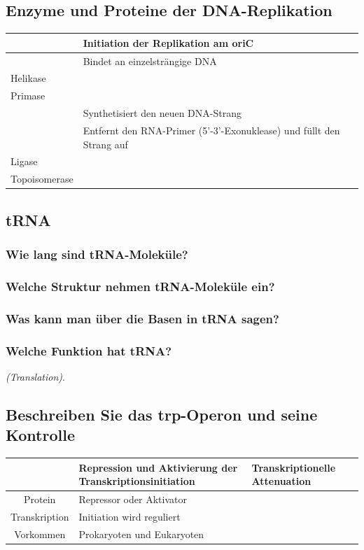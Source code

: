 \documentclass{article}
\begin{document}
\subsection*{Enzyme und Proteine der DNA-Replikation}
\begin{table}[H]
    \centering 
    \begin{tabular}{|p{4cm}|p{11cm}|}
    \hline
     &  Initiation der Replikation am oriC\\\hline 
     & Bindet an einzelsträngige DNA  \\\hline
    Helikase &  \\\hline
    Primase &   \\\hline
     & Synthetisiert den neuen DNA-Strang \\\hline
     & Entfernt den RNA-Primer (5'-3'-Exonuklease) und füllt den Strang auf \\\hline
    Ligase &  \\\hline
    Topoisomerase &  \\\hline
\end{tabular}
\end{table}
\subsection*{tRNA}
\subsubsection*{Wie lang sind tRNA-Moleküle?}
\bigskip\bigskip
\subsubsection*{Welche Struktur nehmen tRNA-Moleküle ein?}
\bigskip\bigskip\bigskip\bigskip
\subsubsection*{Was kann man über die Basen in tRNA sagen?}
\bigskip\bigskip\bigskip\bigskip
\bigskip\bigskip\bigskip\bigskip

\subsubsection*{Welche Funktion hat tRNA?}
\bigskip\bigskip\bigskip\bigskip \textit{(Translation)}. 
\subsection*{Beschreiben Sie das trp-Operon und seine Kontrolle}
\begin{table}[H]
    \centering
    \begin{tabular}{|c||p{5cm}|p{5cm}|} \hline
         & Repression und Aktivierung
der Transkriptionsinitiation &  Transkriptionelle
Attenuation \\ \hline \hline
        Protein & Repressor oder Aktivator &   \\ \hline 
         Transkription & Initiation wird reguliert &   \\ \hline 
        Vorkommen & Prokaryoten und Eukaryoten &  \\ \hline 
    \end{tabular}
    \label{tab:my_label}
\end{table}
\end{document}
